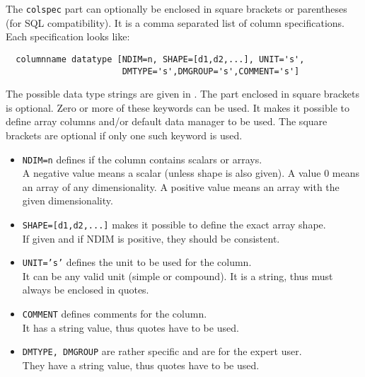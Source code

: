 The \texttt{colspec} part can optionally be enclosed in square
brackets or parentheses (for SQL compatibility).
It is a comma separated list of column specifications.
Each specification looks like:
\begin{verbatim}
  columnname datatype [NDIM=n, SHAPE=[d1,d2,...], UNIT='s',
                       DMTYPE='s',DMGROUP='s',COMMENT='s']
\end{verbatim}
The possible data type strings are given in
.
The part enclosed in square brackets is optional. Zero or more of
these keywords can be used. It makes it possible
to define array columns and/or default data manager to be used.
The square brackets are optional if only one such keyword is used.
\begin{itemize}
\item \texttt{NDIM=n} defines if the column contains scalars or arrays.
\\A negative value means a scalar (unless shape is also given).
A value 0 means an array of any dimensionality. A positive value means
an array with the given dimensionality.
\item \texttt{SHAPE=[d1,d2,...]} makes it possible to define the exact
array shape.
\\If given and if NDIM is positive, they should be consistent.
\item \texttt{UNIT='s'} defines the unit to be used for the column.
\\It can be any valid unit (simple or compound). It is a string,
thus must always be enclosed in quotes. 
\item \texttt{COMMENT} defines comments for the column.
\\It has a string value, thus quotes
have to be used.
\item \texttt{DMTYPE, DMGROUP} are rather specific and are for the expert user.
\\They have a string value, thus quotes
have to be used.
\end{itemize}

